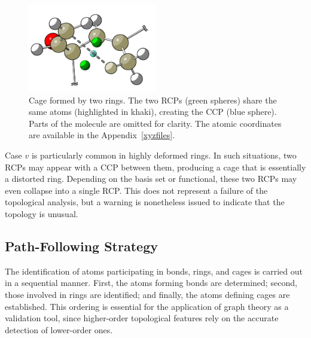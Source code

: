 \newpage
\begin{figure}
  \centering
  \includegraphics[width=0.5\textwidth]{img/ring_cage}
  \caption{Cage formed by two rings. The two \glspl{RCP} (green spheres) share
    the same atoms (highlighted in khaki), creating the \gls{CCP} (blue sphere).
    Parts of the molecule are omitted for clarity. The atomic coordinates are
    available in the Appendix~\ref{xyzfiles}.}
  \label{cage_extra}
\end{figure}

Case $v$ is particularly common in highly deformed rings. In such
situations, two \glspl{RCP} may appear with a \gls{CCP} between them,
producing a cage that is essentially a distorted ring.
Depending on the basis set or functional, these
two \glspl{RCP} may even collapse into a single \gls{RCP}. This does not
represent a failure of the topological analysis, but a warning is
nonetheless issued to indicate that the topology is unusual.

\vspace{0.5cm}%
\newpage
\subsection{Path-Following Strategy}

The identification of atoms participating in bonds, rings, and cages is carried
out in a sequential manner. First, the atoms forming bonds are determined;
second, those involved in rings are identified; and finally, the atoms defining
cages are established. This ordering is essential for the application of graph
theory as a validation tool, since higher-order topological features rely on
the accurate detection of lower-order ones.



